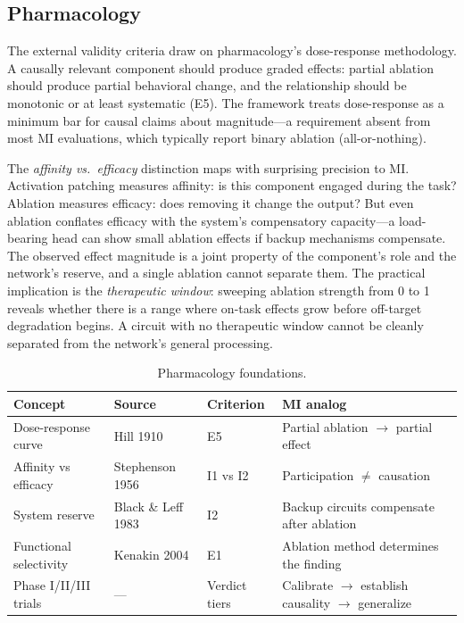 \documentclass[10pt]{article}
\begin{document}
\subsection{Pharmacology}
\label{sec:pharma}

The external validity criteria draw on pharmacology's dose-response methodology. A causally relevant component should produce graded effects: partial ablation should produce partial behavioral change, and the relationship should be monotonic or at least systematic (E5). The framework treats dose-response as a minimum bar for causal claims about magnitude---a requirement absent from most MI evaluations, which typically report binary ablation (all-or-nothing).

The \emph{affinity vs.\ efficacy} distinction maps with surprising precision to MI. Activation patching measures affinity: is this component engaged during the task? Ablation measures efficacy: does removing it change the output? But even ablation conflates efficacy with the system's compensatory capacity---a load-bearing head can show small ablation effects if backup mechanisms compensate. The observed effect magnitude is a joint property of the component's role and the network's reserve, and a single ablation cannot separate them. The practical implication is the \emph{therapeutic window}: sweeping ablation strength from 0 to 1 reveals whether there is a range where on-task effects grow before off-target degradation begins. A circuit with no therapeutic window cannot be cleanly separated from the network's general processing.

\begin{table}[H]
\centering\small
\caption{Pharmacology foundations.}
\renewcommand{\arraystretch}{1.12}
\begin{tabular}{@{}l>{\raggedright\arraybackslash}p{2.2cm}l>{\raggedright\arraybackslash}p{4.5cm}@{}}
\toprule
\textbf{Concept} & \textbf{Source} & \textbf{Criterion} & \textbf{MI analog} \\
\midrule
Dose-response curve & Hill 1910 & E5 & Partial ablation $\to$ partial effect \\
\midrule
Affinity vs efficacy & Stephenson 1956 & I1 vs I2 & Participation $\neq$ causation \\
\midrule
System reserve & Black \& Leff 1983 & I2 & Backup circuits compensate after ablation \\
\midrule
Functional selectivity & Kenakin 2004 & E1 & Ablation method determines the finding \\
\midrule
Phase I/II/III trials & --- & Verdict tiers & Calibrate $\to$ establish causality $\to$ generalize \\
\bottomrule
\end{tabular}
\end{table}
\end{document}
